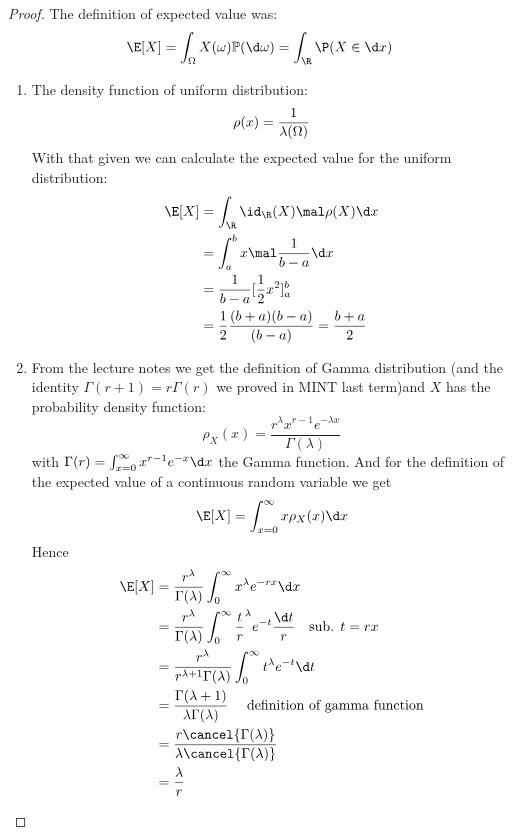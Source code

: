 \subsection{}
\begin{proof}
	The definition of expected value was:
	\[
	\E[X] = \int_{\O} X(\omega)\meas(\d \omega) = \int_{\R} \P(X \in \d x)
	\]
	\begin{enumerate}
		\item The density function of uniform distribution: 
		\[
			\rho(x) = \frac{1}{\lambda(\Omega)}
		\]
		With that given we can calculate the expected value for the uniform distribution:
		\begin{align*}
			\E[X] &= \int_{\R} \id_{\R} (X) \mal \rho(X) \d x\\
			&= \int_a^b x \mal \frac{1}{b-a} \d x\\
			&= \frac{1}{b-a} [\frac{1}{2} x^2]_a^b\\
			&= \frac{1}{2} \frac{(b+a)(b-a)}{(b-a)} = \frac{b+a}{2}
		\end{align*}
		\item From the lecture notes we get the definition of Gamma distribution (and the identity $\Gamma(r+1) = r\Gamma(r)$ we proved in MINT last term)and $X$ has the probability density function:
		\[
			\rho_X (x) = \frac{r^{\lambda} x^{r -1}e^{-\lambda x}}{\Gamma(\lambda)}
		\] with $\Gamma(r) = \int_{x=0}^{\infty} x^{r-1}e^{-x}\d x$ the Gamma function. And for the definition of the expected value of a continuous random variable we get
		\[
			\E[X] = \int_{x=0}^{\infty}x \rho_X (x) \d x
		\]
		Hence
		\begin{align*}
			\E [X] &= \frac{r^\lambda}{\Gamma(\lambda)} \int_0^{\infty} x^{\lambda} e^{-r x} \d x\\
			&= \frac{r^{\lambda}}{\Gamma(\lambda)} \int_0^{\infty} \frac{t}{r}^{\lambda} e^{-t} \frac{\d t}{r}\quad \text{sub. } t = rx\\
			&= \frac{r^{\lambda}}{r^{\lambda +1}\Gamma(\lambda)}\int_0^{\infty} t^{\lambda} e^{-t} \d t\\
			&= \frac{\Gamma(\lambda+1)}{\lambda \Gamma(\lambda)} \quad \text{ definition of gamma function}\\
			&= \frac{r \cancel{\Gamma(\lambda)}}{\lambda \cancel{\Gamma(\lambda)}}\\
			&= \frac{\lambda}{r}
		\end{align*}
	\end{enumerate}
\end{proof}


